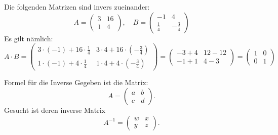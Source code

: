 \begin{bsp}
    {}{}
    Die folgenden Matrizen sind invers zueinander:
    \[
    A = \begin{pmatrix} 3 & 16 \\ 1 & 4 \end{pmatrix}, \quad
    B = \begin{pmatrix} -1 & 4 \\ \frac{1}{4} & -\frac{3}{4} \end{pmatrix}
    \]
    Es gilt nämlich:
    \[
    A \cdot B =
    \begin{pmatrix} 
    3 \cdot (-1) + 16 \cdot \frac{1}{4} & 3 \cdot 4 + 16 \cdot \left(-\frac{3}{4} \right) \\ 
    1 \cdot (-1) + 4 \cdot \frac{1}{4} & 1 \cdot 4 + 4 \cdot \left(-\frac{3}{4} \right)
    \end{pmatrix}
     =
    \begin{pmatrix} 
    -3 + 4 & 12 - 12 \\ 
    -1 + 1 & 4 - 3
    \end{pmatrix}
    =
    \begin{pmatrix} 1 & 0 \\ 0 & 1 \end{pmatrix}
    \]

\end{bsp}
\clearpage







\begin{bsp}
    {Formel für die Inverse}{}
        Gegeben ist die Matrix:
\[
A =
\begin{pmatrix} a & b \\ c & d \end{pmatrix}.
\]
Gesucht ist deren inverse Matrix 
\[
A^{-1} =
\begin{pmatrix} w & x \\ y & z \end{pmatrix}.
\]

\vspace*{18cm}
\end{bsp}
\clearpage



